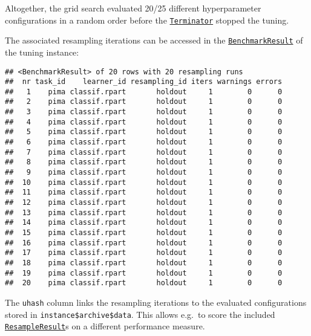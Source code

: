 \documentclass[
]{scrbook}
\newenvironment{Shaded}{\begin{snugshade}}{\end{snugshade}}
\newcommand{\NormalTok}[1]{#1}
\newcommand{\SpecialCharTok}[1]{\textcolor[rgb]{0.00,0.00,0.00}{#1}}
\renewenvironment{Shaded} {\begin{snugshade}\small} {\end{snugshade}}
\begin{document}
Altogether, the grid search evaluated 20/25 different hyperparameter configurations in a random order before the \href{https://bbotk.mlr-org.com/reference/Terminator.html}{\texttt{Terminator}} stopped the tuning.

The associated resampling iterations can be accessed in the \href{https://mlr3.mlr-org.com/reference/BenchmarkResult.html}{\texttt{BenchmarkResult}} of the tuning instance:

\begin{Shaded}
\end{Shaded}

\begin{verbatim}
## <BenchmarkResult> of 20 rows with 20 resampling runs
##  nr task_id    learner_id resampling_id iters warnings errors
##   1    pima classif.rpart       holdout     1        0      0
##   2    pima classif.rpart       holdout     1        0      0
##   3    pima classif.rpart       holdout     1        0      0
##   4    pima classif.rpart       holdout     1        0      0
##   5    pima classif.rpart       holdout     1        0      0
##   6    pima classif.rpart       holdout     1        0      0
##   7    pima classif.rpart       holdout     1        0      0
##   8    pima classif.rpart       holdout     1        0      0
##   9    pima classif.rpart       holdout     1        0      0
##  10    pima classif.rpart       holdout     1        0      0
##  11    pima classif.rpart       holdout     1        0      0
##  12    pima classif.rpart       holdout     1        0      0
##  13    pima classif.rpart       holdout     1        0      0
##  14    pima classif.rpart       holdout     1        0      0
##  15    pima classif.rpart       holdout     1        0      0
##  16    pima classif.rpart       holdout     1        0      0
##  17    pima classif.rpart       holdout     1        0      0
##  18    pima classif.rpart       holdout     1        0      0
##  19    pima classif.rpart       holdout     1        0      0
##  20    pima classif.rpart       holdout     1        0      0
\end{verbatim}

The \texttt{uhash} column links the resampling iterations to the evaluated configurations stored in \texttt{instance\$archive\$data}. This allows e.g.~to score the included \href{https://mlr3.mlr-org.com/reference/ResampleResult.html}{\texttt{ResampleResult}}s on a different performance measure.
\end{document}
